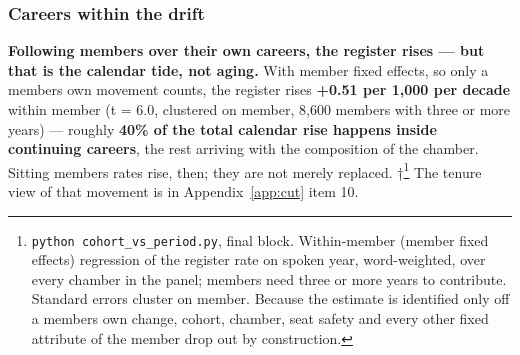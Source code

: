 \subsubsection{Careers within the drift}\label{sec:careers}

\textbf{Following members over their own careers, the register rises --- but that is the calendar tide, not aging.} With member fixed effects, so only a member\textquotesingle s own movement counts, the register rises \textbf{+0.51 per 1,000 per decade} within member (t = 6.0, clustered on member, 8,600 members with three or more years) --- roughly \textbf{40\% of the total calendar rise happens inside continuing careers}, the rest arriving with the composition of the chamber. Sitting members\textquotesingle{} rates rise, then; they are not merely replaced. †\footnote{\texttt{python\ cohort\_\allowbreak{}vs\_\allowbreak{}period.\allowbreak{}py}, final block. Within-member (member fixed effects) regression of the register rate on spoken year, word-weighted, over every chamber in the panel; members need three or more years to contribute. Standard errors cluster on member. Because the estimate is identified only off a member\textquotesingle s own change, cohort, chamber, seat safety and every other fixed attribute of the member drop out by construction.} The tenure view of that movement is in Appendix~\ref{app:cut} item 10.


